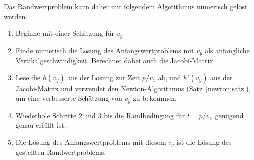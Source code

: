 Das Randwertproblem kann daher mit folgendem Algorithmus numerisch gelöst
werden.
\begin{enumerate}
\item Beginne mit einer Schätzung für $v_y$
\item Finde numerisch die Lösung des Anfangswertproblems mit $v_y$
als anfängliche Vertikalgeschwindigkeit.
Berechnet dabei auch die Jacobi-Matrix
\item Lese die $h(v_y)$ aus der Lösung zur Zeit $p/v_x$ ab, und $h'(v_y)$
aus der Jacobi-Matrix und verwendet den Newton-Algorithmus
(Satz~\ref{newton:satz}), um eine verbesserte Schätzung von $v_y$ 
zu bekommen.
\item Wiederhole Schritte 2 und 3 bis die Randbedingung für $t=p/v_x$
genügend genau erfüllt ist.
\item Die Lösung des Anfangswertproblems mit diesem $v_y$ ist die
Lösung des gestellten Randwertproblems.
\end{enumerate}

